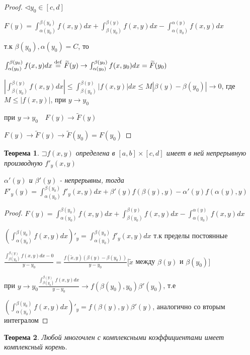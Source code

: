 \documentclass[a4paper, 12pt]{article}
\newcommand\letsymbol{\mathord{\sqsupset}}
\newtheorem{theorem}{Теорема}[section]
\theoremstyle{definition}
\theoremstyle{remark}
\begin{document}
\begin{proof}
     $\triangleleft y_0\in[c,d]$

     $F(y) = \int_{\alpha(y_0)}^{\beta(y_0)}f(x,y)dx + \int_{\beta(y_0)}^{\beta(y)}f(x,y)dx - \int_{\alpha(y_0)}^{\alpha(y)}f(x,y)dx$

     т.к $\beta(y_0), \alpha(y_0) = C$, то 

     $\int_{\alpha(y_0)}^{\beta(y_0)}f(x,y)dx \stackrel{\rm{def}}{=}\widetilde{F}(y)\rightarrow \int_{\alpha(y_0)}^{\beta(y_0)}f(x,y_0)dx = \widetilde{F}(y_0)$

     $|\int_{\beta(y_0)}^{\beta(y)}f(x,y)dx| \leq \int_{\beta(y_0)}^{\beta(y)}|f(x,y)|dx \leq M |\beta(y)-\beta(y_0)|\to 0$, где
     $M \leq |f(x,y)|$, при $y\to y_0$

     при $y \to y_0 \quad F(y) \to \widetilde{F}(y)$

     $F(y)\to \widetilde{F}(y) \to \widetilde{F}(y_0) = F(y_0)$
\end{proof}

\begin{theorem}
     $\letsymbol{}f(x,y)$ определена в $[a,b]\times[c,d]$ имеет в ней непрерывную производную $f'_y(x,y)$

     $\alpha'(y)$ и $\beta'(y)$ - непрерывны, тогда $F'_y(y) = \int_{\alpha(y_0)}^{\beta(y_0)}f'_y(x,y)dx + \beta'(y)f(\beta(y), y) - \alpha'(y)f(\alpha(y), y)$
\end{theorem}

\begin{proof}
     $F(y) = \int_{\alpha(y_0)}^{\beta(y_0)}f(x,y)dx + \int_{\beta(y_0)}^{\beta(y)}f(x,y)dx - \int_{\alpha(y_0)}^{\alpha(y)}f(x,y)dx$

     $(\int_{\alpha(y_0)}^{\beta(y_0)}f(x,y)dx)'_y = \int_{\alpha(y_0)}^{\beta(y_0)}f'_y(x,y)dx$ т.к пределы постоянные

     $\frac{\int_{\beta(y_0)}^{\beta(y)} f(x,y)dx - 0}{y-y_0} = \frac{f(\widetilde{x}, y) (\beta(y) - \beta(y_0))}{y-y_0} [\widetilde{x}$ между $\beta(y)$ и $\beta(y_0)]$

     при $y  \to y_0 \frac{\int_{\beta(y_0)}^{\beta(y)} f(x,y)dx}{y-y_0} \to f(\beta(y_0), y_0)\beta'(y_0)$, т.е
     
     $(\int_{\alpha(y_0)}^{\beta(y_0)}f(x,y)dx)'_y = f(\beta(y), y)\beta'(y)$, аналогично со вторым интегралом
\end{proof}

\begin{theorem}
     Любой многочлен с комплексными коэффициентами имеет комплексный корень.
\end{theorem}
\end{document}
